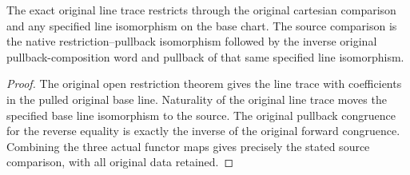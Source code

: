 \begin{lemma}
\label{lem:kn-original-line-trace-native-fixed-restriction}
\leanok
The exact original line trace restricts through the original cartesian
comparison and any specified line isomorphism on the base chart. The source
comparison is the native restriction--pullback isomorphism followed by the
inverse original pullback-composition word and pullback of that same specified
line isomorphism.
\end{lemma}
\begin{proof}
The original open restriction theorem gives the line trace with coefficients
in the pulled original base line. Naturality of the original line trace moves
the specified base line isomorphism to the source. The original pullback
congruence for the reverse equality is exactly the inverse of the original
forward congruence. Combining the three actual functor maps gives precisely
the stated source comparison, with all original data retained.
\end{proof}
